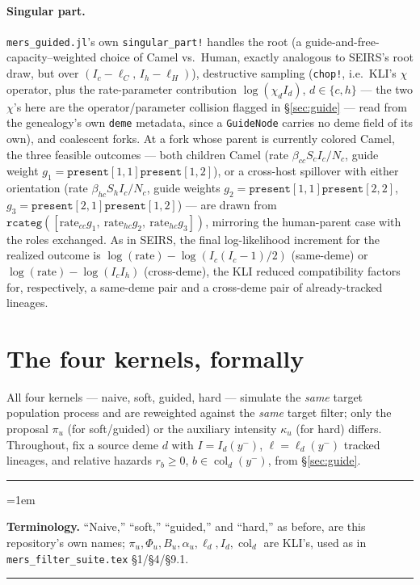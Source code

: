 \documentclass[11pt]{article}
\newcommand{\col}{\operatorname{col}}
\theoremstyle{plain}
\newenvironment{notebox}{%
  \par\addvspace{8pt}\noindent%
  {\color{chline}\rule{\linewidth}{0.8pt}}\par\smallskip%
  \begingroup\color{chline!40!black}%
  \leftskip=1em\relax
}{%
  \par\endgroup\smallskip%
  {\color{chline}\rule{\linewidth}{0.8pt}}\par\addvspace{8pt}%
}
\begin{document}
\paragraph{Singular part.} \texttt{mers\_guided.jl}'s own \texttt{singular\_part!} handles the root (a
guide-and-free-capacity--weighted choice of Camel vs.\ Human, exactly analogous to SEIRS's root
draw, but over $(I_c-\ell_C,\,I_h-\ell_H)$), destructive sampling (\texttt{chop!}, i.e.\ KLI's
$\chi$ operator, plus the rate-parameter contribution $\log(\chi_d I_d)$, $d\in\{c,h\}$ --- the two
$\chi$'s here are the operator/parameter collision flagged in \S\ref{sec:guide} --- read from the
genealogy's own \texttt{deme} metadata, since a
\texttt{GuideNode} carries no deme field of its own), and coalescent forks. At a fork whose parent
is currently colored Camel, the three feasible outcomes --- both children Camel (rate $\beta_{cc}
S_cI_c/N_c$, guide weight $g_1=\texttt{present}[1,1]\texttt{present}[1,2]$), or a cross-host
spillover with either orientation (rate $\beta_{hc}S_hI_c/N_c$, guide weights
$g_2=\texttt{present}[1,1]\texttt{present}[2,2]$, $g_3=\texttt{present}[2,1]\texttt{present}[1,2]$)
--- are drawn from $\texttt{rcateg}([\text{rate}_{cc}g_1,\ \text{rate}_{hc}g_2,\
\text{rate}_{hc}g_3])$, mirroring the human-parent case with the roles exchanged. As in SEIRS, the
final log-likelihood increment for the realized outcome is $\log(\text{rate}) -
\log(I_c(I_c{-}1)/2)$ (same-deme) or $\log(\text{rate}) - \log(I_cI_h)$ (cross-deme), the KLI
reduced compatibility factors for, respectively, a same-deme pair and a cross-deme pair of
already-tracked lineages.

\section{The four kernels, formally}
\label{sec:kernels}

All four kernels --- naive, soft, guided, hard --- simulate the \emph{same} target population
process and are reweighted against the \emph{same} target filter; only the proposal $\pi_u$ (for
soft/guided) or the auxiliary intensity $\kappa_u$ (for hard) differs. Throughout, fix a source
deme $d$ with $I=I_d(y^-)$, $\ell=\ell_d(y^-)$ tracked lineages, and relative hazards $r_b\ge0$,
$b\in\col_d(y^-)$, from \S\ref{sec:guide}.

\begin{notebox}
\textbf{Terminology.} ``Naive,'' ``soft,'' ``guided,'' and ``hard,'' as before, are this
repository's own names; $\pi_u,\Phi_u,B_u,\alpha_u,\ell_d,I_d,\col_d$ are KLI's, used as in
\texttt{mers\_filter\_suite.tex} \S1/\S4/\S9.1.
\end{notebox}
\end{document}
